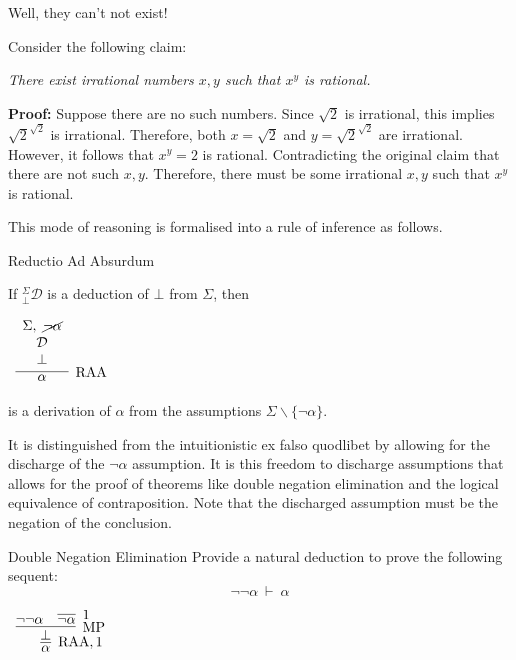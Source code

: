 \documentclass{book}
\begin{document}
    \begin{eg}{Well, they can't not exist!}

        Consider the following claim:

        \begin{center}
            \emph{There exist irrational numbers $x,y$ such that $x^{y}$ is rational.}
        \end{center}
        
        {\bf Proof:} Suppose there are no such numbers. Since $\sqrt{2}$ is irrational, this implies $\sqrt{2}^{\sqrt{2}}$ is irrational. Therefore, both $x = \sqrt{2}$ and $y = \sqrt{2}^{\sqrt{2}}$ are irrational. However, it follows that $x^{y} = 2$ is rational. Contradicting the original claim that there are not such $x,y$. Therefore, there must be some irrational $x,y$ such that $x^{y}$ is rational. 
    \end{eg}

    This mode of reasoning is formalised into a rule of inference as follows. 

    {Reductio Ad Absurdum}

        If $^{\Sigma}_{\bot}\mathcal{D}$ is a deduction of $\bot$ from $\Sigma$, then

        \begin{center}		
            $\begin{array}{c}		
            \infer[\RAA]{\alpha}
            {\begin{array}{c} \Sigma, \ \cancel{\lnot\alpha} \\ \mathcal{D} \\ \bot \end{array}}
            \end{array}$
        \end{center}  

        is a derivation of $\alpha$ from the assumptions $\Sigma \backslash\{\lnot\alpha\}$.
    

    It is distinguished from the intuitionistic ex falso quodlibet by allowing for the discharge of the $\lnot\alpha$ assumption. It is this freedom to discharge assumptions that allows for the proof of theorems like double negation elimination and the logical equivalence of contraposition. Note that the discharged assumption must be the negation of the conclusion. 

    \begin{eg}{Double Negation Elimination}
        Provide a natural deduction to prove the following sequent: $$\lnot\lnot\alpha \ \vdash \ \alpha$$

        \begin{center}
            $\begin{array}{c}
                \infer[\RAA,1]{\alpha}
                    {\infer[\MP]{\bot}
                        {\lnot\lnot \alpha
                        &
                        \infer[1]{\lnot\alpha}{}}}
            \end{array}$
        \end{center}
    \end{eg}
\end{document}
